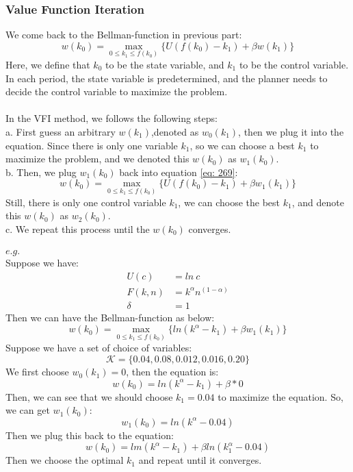 \documentclass{article}
\begin{document}
\subsubsection{Value Function Iteration}
We come back to the Bellman-function in previous part:
\begin{equation}
	w(k_0) = \mathop{max}\limits_{0 \leq k_1 \leq f(k_0)}\{U(f(k_0) - k_1) + \beta w(k_1)\} \label{eq: 329}
\end{equation}
Here, we define that $k_0$ to be the state variable, and $k_1$ to be the control variable. In each period, the state variable is predetermined, and the planner needs to decide the control variable to maximize the problem.\\\\
In the VFI method, we follows the following steps:\\
\indent a. First guess an arbitrary $w(k_1)$,denoted as $w_0(k_1)$, then we plug it into the equation. Since there is only one variable $k_1$, so we can choose a best $k_1$ to maximize the problem, and we denoted this $w(k_0)$ as $w_1(k_0)$.\\
\indent b. Then, we plug $w_1(k_0)$ back into equation \eqref{eq: 269}:
\begin{equation}
	w(k_0) = \mathop{max}\limits_{0 \leq k_1 \leq f(k_0)}\{U(f(k_0) - k_1) + \beta w_1(k_1)\} \nonumber
\end{equation}
\indent Still, there is only one control variable $k_1$, we can choose the best $k_1$, and denote this $w(k_0)$ as $w_2(k_0)$.\\
\indent c. We repeat this process until the $w(k_0)$ converges.\\\\
$e.g.$\\
Suppose we have:
\begin{align*}
	U(c) &= ln\ c\\
	F(k, n) &= k^\alpha n^{(1-\alpha)}\\
	\delta &= 1
\end{align*}
Then we can have the Bellman-function as below:
\begin{equation}
	w(k_0) = \mathop{max}\limits_{0 \leq k_1 \leq f(k_0)}\{ln(k^\alpha - k_1) + \beta w_1(k_1)\} \nonumber
\end{equation}
Suppose we have a set of choice of variables:
\begin{equation*}
	\mathscr{K} = \{0.04, 0.08, 0.012, 0.016, 0.20\}
\end{equation*}
We first choose $w_0(k_1) = 0$, then the equation is:
\begin{equation}
	w(k_0) = ln(k^\alpha - k_1) + \beta * 0 \nonumber
\end{equation}
Then, we can see that we should choose $k_1 = 0.04$ to maximize the equation. So, we can get $w_1(k_0)$:
\begin{equation}
	w_1(k_0) = ln(k^\alpha - 0.04) \nonumber
\end{equation}
Then we plug this back to the equation:
\begin{equation}
	w(k_0) = lm(k^\alpha - k_1) + \beta ln(k^\alpha_1 - 0.04) \nonumber
\end{equation}
Then we choose the optimal $k_1$ and repeat until it converges.
\end{document}
